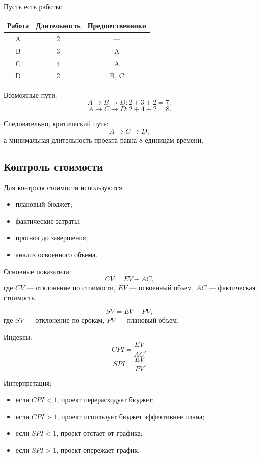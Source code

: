 \documentclass[12pt,a4paper]{article}
\begin{document}
Пусть есть работы:

\begin{center}
\begin{tabular}{|c|c|c|}
\hline
\textbf{Работа} & \textbf{Длительность} & \textbf{Предшественники} \\
\hline
A & 2 & --- \\
\hline
B & 3 & A \\
\hline
C & 4 & A \\
\hline
D & 2 & B, C \\
\hline
\end{tabular}
\end{center}

Возможные пути:
\[
A \rightarrow B \rightarrow D: 2 + 3 + 2 = 7,
\]
\[
A \rightarrow C \rightarrow D: 2 + 4 + 2 = 8.
\]

Следовательно, критический путь:
\[
A \rightarrow C \rightarrow D,
\]
а минимальная длительность проекта равна $8$ единицам времени.

\subsection{Контроль стоимости}

Для контроля стоимости используются:
\begin{itemize}
    \item плановый бюджет;
    \item фактические затраты;
    \item прогноз до завершения;
    \item анализ освоенного объема.
\end{itemize}

Основные показатели:
\[
CV = EV - AC,
\]
где $CV$ --- отклонение по стоимости, $EV$ --- освоенный объем, $AC$ --- фактическая стоимость.

\[
SV = EV - PV,
\]
где $SV$ --- отклонение по срокам, $PV$ --- плановый объем.

Индексы:
\[
CPI = \frac{EV}{AC},
\]
\[
SPI = \frac{EV}{PV}.
\]

Интерпретация:
\begin{itemize}
    \item если $CPI < 1$, проект перерасходует бюджет;
    \item если $CPI > 1$, проект использует бюджет эффективнее плана;
    \item если $SPI < 1$, проект отстает от графика;
    \item если $SPI > 1$, проект опережает график.
\end{itemize}
\end{document}
